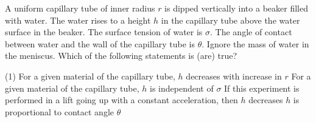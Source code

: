 
\item A uniform capillary tube of inner radius \( r \) is dipped vertically into a beaker filled with water. The water rises to a height \( h \) in the capillary tube above the water surface in the beaker. The surface tension of water is \( \sigma \). The angle of contact between water and the wall of the capillary tube is \( \theta \). Ignore the mass of water in the meniscus. Which of the following statements is (are) true?
    \begin{tasks}(1)
        \task For a given material of the capillary tube, \( h \) decreases with increase in \( r \)
        \task For a given material of the capillary tube, \( h \) is independent of \( \sigma \)
        \task If this experiment is performed in a lift going up with a constant acceleration, then \( h \) decreases
        \task \( h \) is proportional to contact angle \( \theta \)
    \end{tasks}
